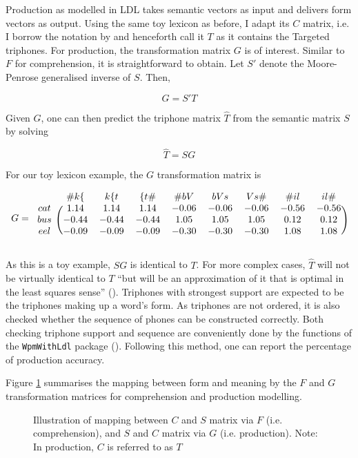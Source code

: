 Production as modelled in LDL takes semantic vectors as input and delivers form vectors as output. Using the same toy lexicon as before, I adapt its $C$ matrix, i.e. I borrow the notation by \citet{Baayen2019} and henceforth call it $T$ as it contains the Targeted triphones. For production, the transformation matrix $G$ is of interest. Similar to $F$ for comprehension, it is straightforward to obtain. Let $S'$ denote the Moore-Penrose generalised inverse of $S$. Then,

\begin{equation}
\label{eq:GST}
    G=S'T
\end{equation}

Given $G$, one can then predict the triphone matrix $\hat{T}$ from the semantic matrix $S$ by solving 

\begin{equation}
\label{eq:TSG}
    \hat{T}=SG
\end{equation}

For our toy lexicon example, the $G$ transformation matrix is 

\begin{equation}
\label{eq:Gmat}
  G = 
    \begin{blockarray}{ccccccccc}
        & {\#k\{} & {k\{t} & {\{t\#} & {\#bV} & {bVs} & {Vs\#} & {\#il} & {il\#} \\
      \begin{block}{c(cccccccc)}
        cat & 1.14 & 1.14 & 1.14 & -0.06 & -0.06 & -0.06 & -0.56 & -0.56 \\
        bus & -0.44 & -0.44 & -0.44 & 1.05 & 1.05 & 1.05 & 0.12 & 0.12 \\
        eel & -0.09 & -0.09 & -0.09 & -0.30 & -0.30 & -0.30 & 1.08 & 1.08 \\
      \end{block}
    \end{blockarray}
\end{equation}

As this is a toy example, $SG$ is identical to $T$. For more complex cases, $\hat{T}$ will not be virtually identical to $T$ “but will be an approximation of it that is optimal in the least squares sense” (\cite[21]{Baayen2019}). Triphones with strongest support are expected to be the triphones making up a word’s form. As triphones are not ordered, it is also checked whether the sequence of phones can be constructed correctly. Both checking triphone support and sequence are conveniently done by the functions of the \texttt{WpmWithLdl} package (\cite{Baayen2019wpm}). Following this method, one can report the percentage of production accuracy.
	
Figure \ref{fig:3_1} summarises the mapping between form and meaning by the $F$ and $G$ transformation matrices for comprehension and production modelling.

\begin{figure}
    \centering
    
    \caption{Illustration of mapping between $C$ and $S$ matrix via $F$ (i.e. comprehension), and $S$ and $C$ matrix via $G$ (i.e. production). Note: In production, $C$ is referred to as $T$}
    \label{fig:3_1}
\end{figure}
